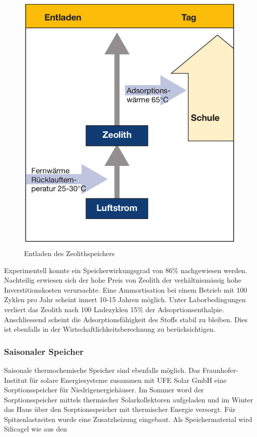 \documentclass[11pt,a4paper]{scrartcl}
\begin{document}
\begin{figure}[h!]
\begin{center}
\includegraphics[scale=1]{images/Entladen.jpg}
\caption{Entladen des Zeolithspeichers \cite{BINE2}}
\label{fig:Entladen}
\end{center}
\end{figure}
Experimentell konnte ein Speicherwirkungsgrad von 86\% nachgewiesen werden.
Nachteilig erwiesen sich der hohe Preis von Zeolith der verhältnismässig hohe
Inverstitionskosten verursachte. Eine Ammortisation bei einem Betrieb mit 100
Zyklen pro Jahr scheint innert 10-15 Jahren möglich. Unter Laborbedingungen
verliert das Zeolith nach 100 Ladezyklen 15\% der Adsoprtionsenthalpie.
Anschliessend scheint die Adsorptionsfähigkeit des Stoffs stabil zu bleiben.
Dies ist ebenfalls in der Wirtschaftlichkeitsberechnung zu berücksichtigen.
\cite{BINE2}

\subsubsection{Saisonaler Speicher}
Saisonale thermochemische Speicher sind ebenfalls möglich. Das Fraunhofer-
Institut für solare Energiesysteme zusammen mit UFE Solar GmbH eine
Sorptionsspeicher für Niedrigenergiehäuser. Im Sommer word der Sorptionsspeicher
mittels thermischer Solarkollektoren aufgeladen und im Winter das Haus über den
Sorptionsspeicher mit thermischer Energie versorgt. Für Spitzenlastzeiten wurde
eine Zusatzheizung eingebaut. Als Speichermaterial wird Silicagel wie aus den 
\newpage
\end{document}
